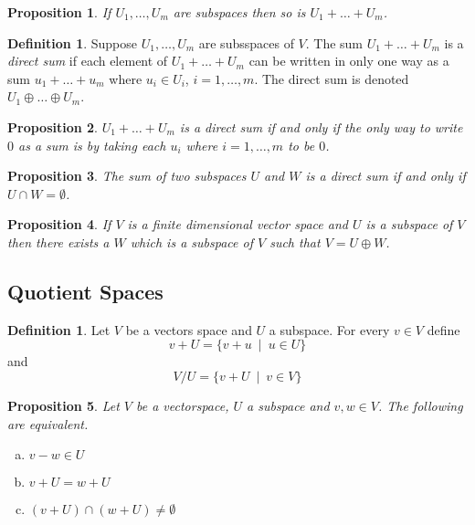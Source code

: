 \documentclass[12pt,letterpaper]{amsart}
\theoremstyle{plain}
\newtheorem{proposition}{Proposition}[section]
\theoremstyle{definition}
\newtheorem{definition}[theorem]{Definition}
\numberwithin{equation}{section}
\begin{document}
\begin{proposition} If $U_1, \ldots, U_m$ are subspaces then so is $U_1+\ldots+U_m$. 
\end{proposition}

\begin{definition} Suppose $U_1,\ldots, U_m$ are subsspaces of $V$. The sum $U_1+\ldots+U_m$ is a \emph{direct sum} if each element of $U_1+\ldots+U_m$ can be written in only one way as a sum $u_1+\ldots +u_m$ where $u_i\in U_i$, $i=1,\ldots,m$. The direct sum is denoted $U_1\oplus \ldots \oplus U_m$. 
\end{definition}

\begin{proposition}  $U_1+\ldots+U_m$ is a direct sum if and only if the only way to write $0$ as a sum is by taking each $u_i$ where $i=1, \ldots, m$ to be $0$. 
\end{proposition}

\begin{proposition}  The sum of two subspaces $U$ and $W$ is a direct sum if and only if\\ $U\cap W=\emptyset$. 
\end{proposition}

\begin{proposition} If $V$ is a finite dimensional vector space and $U$ is a subspace of $V$ then there exists a $W$ which is a subspace of $V$ such that $V=U\oplus W$. 
\end{proposition}

\subsection{Quotient Spaces} 

\begin{definition}Let $V$ be a vectors space and $U$ a subspace. For every $v\in V$ define 
\[v+U=\{v+u\ \mid\  u\in U\}\]
and 
\[V/U=\{v+U\ \mid\  v\in V\}\]
\end{definition}
\begin{proposition}Let $V$ be a vectorspace, $U$ a subspace and $v,w\in V$.  The following are equivalent. 
\begin{enumerate}[(a)]
\item $v-w\in U$
\item $v+U=w+U$
\item $(v+U)\cap (w+U)\neq \emptyset$
\end{enumerate}
\end{proposition}
\end{document}
